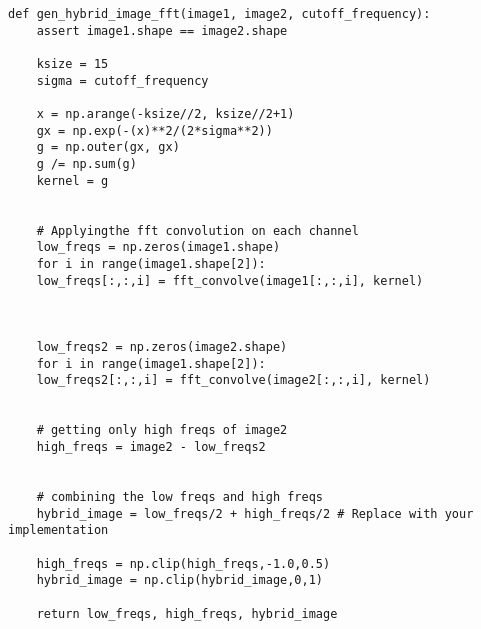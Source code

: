 \newpage
	
\begin{lstlisting}
def gen_hybrid_image_fft(image1, image2, cutoff_frequency):
	assert image1.shape == image2.shape
	
	ksize = 15
	sigma = cutoff_frequency
	
	x = np.arange(-ksize//2, ksize//2+1)
	gx = np.exp(-(x)**2/(2*sigma**2))
	g = np.outer(gx, gx)
	g /= np.sum(g)
	kernel = g
	
	
	# Applyingthe fft convolution on each channel
	low_freqs = np.zeros(image1.shape)
	for i in range(image1.shape[2]):
	low_freqs[:,:,i] = fft_convolve(image1[:,:,i], kernel)
	
	
	
	low_freqs2 = np.zeros(image2.shape)
	for i in range(image1.shape[2]):
	low_freqs2[:,:,i] = fft_convolve(image2[:,:,i], kernel)
	
	
	# getting only high freqs of image2
	high_freqs = image2 - low_freqs2
	
	
	# combining the low freqs and high freqs
	hybrid_image = low_freqs/2 + high_freqs/2 # Replace with your implementation
	
	high_freqs = np.clip(high_freqs,-1.0,0.5)
	hybrid_image = np.clip(hybrid_image,0,1)
	
	return low_freqs, high_freqs, hybrid_image


\end{lstlisting}

